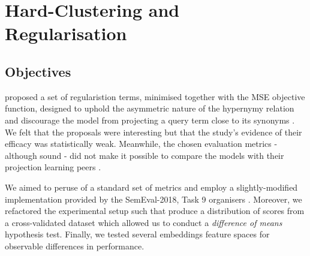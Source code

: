 \section{Hard-Clustering and Regularisation}
\subsection{Objectives}
\citeauthor{ustalov2017negative} proposed a set of regularistion terms, minimised together with the \ac{MSE} objective function, designed to uphold the asymmetric nature of the hypernymy relation and discourage the model from projecting a query term close to its synonyms \citep{ustalov2017negative}.  We felt that the proposals were interesting but that the study's evidence of their efficacy was statistically weak.  Meanwhile, the chosen evaluation metrics - although sound - did not make it possible to compare the models with their projection learning peers \citep{yamane2016distributional, bernier2018crim}.  

We aimed to peruse of a standard set of metrics and employ a slightly-modified implementation provided by the SemEval-2018, Task 9 organisers \citep{camacho2018semeval}.  Moreover, we refactored the experimental setup such that produce a distribution of scores from a cross-validated dataset which allowed us to conduct a \textit{difference of means} hypothesis test.  Finally, we tested several embeddings feature spaces for observable differences in performance.

